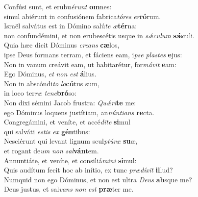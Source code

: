 \evenverse Confúsi sunt, et erubu\textit{é}\textit{runt} \textbf{om}nes:~\*\\
\evenverse simul abiérunt in confusiónem fabrica\textit{tó}\textit{res} \textit{er}\textbf{ró}rum.\\
\oddverse Israël salvátus est in Dómino salú\textit{te} \textit{æ}\textbf{tér}na:~\*\\
\oddverse non confundémini, et non erubescétis usque in \textit{sǽ}\textit{cu}\textit{lum} \textbf{sǽ}culi.\\
\evenverse Quia hæc dicit Dóminus \textit{cre}\textit{ans} \textbf{cæ}los,~\*\\
\evenverse ipse Deus formans terram, et fáciens eam, i\textit{pse} \textit{pla}\textit{stes} \textbf{e}jus:\\
\oddverse Non in vanum creávit eam, ut habitarétur, for\textit{má}\textit{vit} \textbf{e}am:~\*\\
\oddverse Ego Dóminus, \textit{et} \textit{non} \textit{est} \textbf{á}lius.\\
\evenverse Non in abscóndi\textit{to} \textit{lo}\textbf{cú}tus sum,~\*\\
\evenverse in loco ter\textit{ræ} \textit{te}\textit{ne}\textbf{bró}so:\\
\oddverse Non dixi sémini Jacob frustra: \textit{Quǽ}\textit{ri}\textbf{te} me:~\*\\
\oddverse ego Dóminus loquens justítiam, an\textit{nún}\textit{ti}\textit{ans} \textbf{re}cta.\\
\evenverse Congregámini, et veníte, et accé\textit{di}\textit{te} \textbf{si}mul~\*\\
\evenverse qui salváti \textit{e}\textit{stis} \textit{ex} \textbf{gén}tibus:\\
\oddverse Nesciérunt qui levant lignum scul\textit{ptú}\textit{ræ} \textbf{su}æ,~\*\\
\oddverse et rogant de\textit{um} \textit{non} \textit{sal}\textbf{ván}tem.\\
\evenverse Annuntiáte, et veníte, et consiliá\textit{mi}\textit{ni} \textbf{si}mul:~\*\\
\evenverse Quis audítum fecit hoc ab inítio, ex tunc \textit{præ}\textit{dí}\textit{xit} \textbf{il}lud?\\
\oddverse Numquid non ego Dóminus, et non est ultra \textit{De}\textit{us} \textbf{ab}sque me?~\*\\
\oddverse Deus justus, et sal\textit{vans} \textit{non} \textit{est} \textbf{præ}ter me.\\
